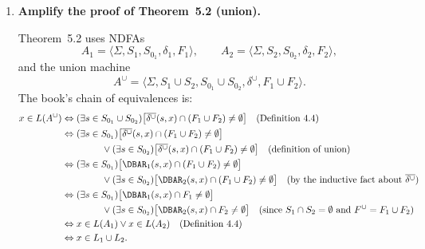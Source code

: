 \begin{enumerate}[{5.}1. ]
\begin{proof}
Conversely, consider an accepting path of $A_*$ on some nonempty word $x$.
Because $\delta_*(q_0,\pmb{a})=\emptyset$, the path must begin in some state of
$S_0$.  Each time the path uses one of the extra transitions
$\bigcup_{t\in S_0}\delta(t,\pmb{a})$ from a final state, it starts a fresh copy
of the original machine on the next factor of the input.  Thus the input splits
into finitely many consecutive blocks, each of which labels a path in $A$ from a
start state to a final state; hence each block lies in $L$.  Therefore
$x\in L^*$.
\end{proof}

\item \textbf{Amplify the proof of Theorem~5.2 (union).}

Theorem~5.2 uses NDFAs
\[
A_1=\langle\Sigma,S_1,S_{0_1},\delta_1,F_1\rangle,\qquad
A_2=\langle\Sigma,S_2,S_{0_2},\delta_2,F_2\rangle,
\]
and the union machine
\[
A^\cup=\langle\Sigma,S_1\cup S_2,S_{0_1}\cup S_{0_2},\delta^\cup,F_1\cup F_2\rangle.
\]
The book's chain of equivalences is:
\begin{align*}
x\in L(A^\cup)
&\Leftrightarrow
(\exists s\in S_{0_1}\cup S_{0_2})
\bigl[\overline{\delta^\cup}(s,x)\cap(F_1\cup F_2)\neq\emptyset\bigr]
\quad\text{(Definition~4.4)} \\
&\Leftrightarrow
(\exists s\in S_{0_1})
\bigl[\overline{\delta^\cup}(s,x)\cap(F_1\cup F_2)\neq\emptyset\bigr] \\
&\hspace{1.5cm}\vee
(\exists s\in S_{0_2})
\bigl[\overline{\delta^\cup}(s,x)\cap(F_1\cup F_2)\neq\emptyset\bigr]
\quad\text{(definition of union)} \\
&\Leftrightarrow
(\exists s\in S_{0_1})
\bigl[\DBAR_1(s,x)\cap(F_1\cup F_2)\neq\emptyset\bigr] \\
&\hspace{1.5cm}\vee
(\exists s\in S_{0_2})
\bigl[\DBAR_2(s,x)\cap(F_1\cup F_2)\neq\emptyset\bigr]
\quad\text{(by the inductive fact about $\overline{\delta^\cup}$)} \\
&\Leftrightarrow
(\exists s\in S_{0_1})
\bigl[\DBAR_1(s,x)\cap F_1\neq\emptyset\bigr] \\
&\hspace{1.5cm}\vee
(\exists s\in S_{0_2})
\bigl[\DBAR_2(s,x)\cap F_2\neq\emptyset\bigr]
\quad\text{(since $S_1\cap S_2=\emptyset$ and $F^\cup=F_1\cup F_2$)} \\
&\Leftrightarrow x\in L(A_1)\vee x\in L(A_2)
\quad\text{(Definition~4.4)} \\
&\Leftrightarrow x\in L_1\cup L_2.
\end{align*}


\end{enumerate}
